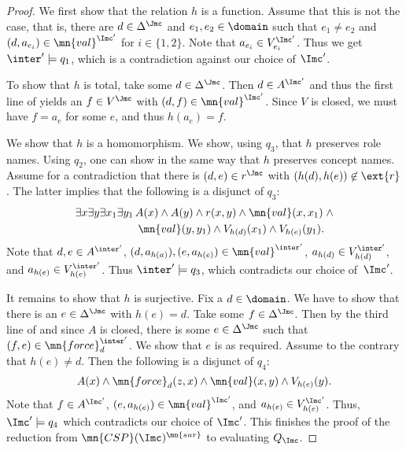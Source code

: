 \documentclass{lmcs}
\theoremstyle{definition}
\begin{document}
\begin{proof}
  We first show that the relation $h$ is a function. Assume that this
  is not the case, that is, there are $d\in\Delta^\Jmc$ and
  $e_1,e_2\in\domain$ such that $e_1\neq e_2$ and $(d,a_{e_i}) \in
  \mn{val}^{\Imc'}$ for $i \in \{1,2\}$. Note that $a_{e_i} \in
  V_{e_i}^{\Imc'}$. Thus we get $\inter'\models q_1$, which is a
  contradiction against our choice of $\Imc'$. 

  To show that $h$ is
  total, take some $d \in \Delta^\Jmc$. Then $d \in A^{\Imc'}$ and
  thus the first line of \Tmc yields an $f \in V^\Jmc$ with $(d,f) \in
  \mn{val}^{\Imc'}$. Since $V$ is closed, we must have $f=a_e$ for
  some $e$, and thus $h(a_e)=f$.

  We show that $h$ is a homomorphism. We show, using $q_{3}$, that $h$ preserves role names. Using $q_{2}$, one can show in 
  the same way that $h$ preserves concept names. Assume for a
  contradiction that there is $(d,e) \in r^\Jmc$ with
  $(h(d),h(e))\not\in\ext{r}$. The latter implies that 
  the following is a disjunct of $q_3$:
  $$
  \begin{array}{l}
    \exists
    x\exists y\exists x_1 \exists y_1\, A(x) \wedge A(y) \wedge r(x,y)
    \wedge \mn{val}(x,x_1) \; \wedge \\[1mm]
    \hspace*{2cm} \mn{val}(y,y_1) \wedge V_{h(d)}(x_1) \wedge V_{h(e)}(y_1).
  \end{array}
  $$
%
  Note that $d,e\in A^{\inter'}$, $(d,a_{h(a)}),
  (e,a_{h(e)})\in\mn{val}^{\inter'}$, $a_{h(d)}\in
  V^{\inter'}_{h(d)}$, and $a_{h(e)}\in V^{\inter'}_{h(e)}$. Thus $\inter'\models q_3$, which contradicts our choice of~$\Imc'$.

  It remains to show that $h$ is surjective. Fix a $d\in\domain$. We
  have to show that there is an $e \in \Delta^\Jmc$ with
  $h(e)=d$. Take some $f\in\Delta^\Jmc$. Then by the third line of
  \Tmc and since $A$ is closed, there is some $e\in\Delta^\Jmc$ such
  that $(f,e)\in\mn{force}_d^{\inter'}$. We show that $e$ is as
  required.  Assume to the contrary that $h(e) \neq d$. Then the
  following is a disjunct of $q_4$:
  $$
  A(x) \wedge \mn{force}_d(z,x) \wedge \mn{val}(x,y) \wedge
  V_{h(e)}(y).
  $$
  Note that $f \in A^{\Imc'}$, $(e,a_{h(e)}) \in \mn{val}^{\Imc'}$,
  and $a_{h(e)} \in V_{h(e)}^{\Imc'}$. Thus, $\Imc'\models q_{4}$ which contradicts our choice of
  $\Imc'$. This finishes the proof of the reduction from $\mn{CSP}(\Imc)^{\mn{sur}}$ to evaluating $Q_{\Imc}$.
  
\bigskip


\end{proof}
\end{document}

